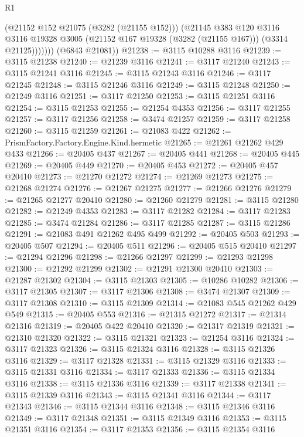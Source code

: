 \begin{lexlean}{R1}
\begin{coremodule}
                (@21152 @152 @21075 (@3282 (@21155 @152)))
                (@21145
                  @383
                  @120
                  @3116
                  @3116
                  @19328
                  @3005
                  (@21152 @167 @19328 (@3282 (@21155 @167)))
                  (@3314 @21125)))))))
      (@6843 @21081))
@21238 := @3115 @10288 @3116
@21239 := @3115 @21238
@21240 := @21239 @3116
@21241 := @3117 @21240
@21243 := @3115 @21241 @3116
@21245 := @3115 @21243 @3116
@21246 := @3117 @21245
@21248 := @3115 @21246 @3116
@21249 := @3115 @21248
@21250 := @21249 @3116
@21251 := @3117 @21250
@21253 := @3115 @21251 @3116
@21254 := @3115 @21253
@21255 := @21254 @4353
@21256 := @3117 @21255
@21257 := @3117 @21256
@21258 := @3474 @21257
@21259 := @3117 @21258
@21260 := @3115 @21259
@21261 := @21083 @422
@21262 := PrismFactory.Factory.Engine.Kind.hermetic
@21265 := @21261 @21262 @429 @433
@21266 := @20405 @437
@21267 := @20405 @441
@21268 := @20405 @445
@21269 := @20405 @449
@21270 := @20405 @453
@21272 := @20405 @457 @20410
@21273 := @21270 @21272
@21274 := @21269 @21273
@21275 := @21268 @21274
@21276 := @21267 @21275
@21277 := @21266 @21276
@21279 := @21265 @21277 @20410
@21280 := @21260 @21279
@21281 := @3115 @21280
@21282 := @21249 @4353
@21283 := @3117 @21282
@21284 := @3117 @21283
@21285 := @3474 @21284
@21286 := @3117 @21285
@21287 := @3115 @21286
@21291 := @21083 @491 @21262 @495 @499
@21292 := @20405 @503
@21293 := @20405 @507
@21294 := @20405 @511
@21296 := @20405 @515 @20410
@21297 := @21294 @21296
@21298 := @21266 @21297
@21299 := @21293 @21298
@21300 := @21292 @21299
@21302 := @21291 @21300 @20410
@21303 := @21287 @21302
@21304 := @3115 @21303
@21305 := @10286 @10282
@21306 := @3117 @21305
@21307 := @3117 @21306
@21308 := @3474 @21307
@21309 := @3117 @21308
@21310 := @3115 @21309
@21314 := @21083 @545 @21262 @429 @549
@21315 := @20405 @553
@21316 := @21315 @21272
@21317 := @21314 @21316
@21319 := @20405 @422 @20410
@21320 := @21317 @21319
@21321 := @21310 @21320
@21322 := @3115 @21321
@21323 := @21254 @3116
@21324 := @3117 @21323
@21326 := @3115 @21324 @3116
@21328 := @3115 @21326 @3116
@21329 := @3117 @21328
@21331 := @3115 @21329 @3116
@21333 := @3115 @21331 @3116
@21334 := @3117 @21333
@21336 := @3115 @21334 @3116
@21338 := @3115 @21336 @3116
@21339 := @3117 @21338
@21341 := @3115 @21339 @3116
@21343 := @3115 @21341 @3116
@21344 := @3117 @21343
@21346 := @3115 @21344 @3116
@21348 := @3115 @21346 @3116
@21349 := @3117 @21348
@21351 := @3115 @21349 @3116
@21353 := @3115 @21351 @3116
@21354 := @3117 @21353
@21356 := @3115 @21354 @3116

\end{coremodule}
\end{lexlean}
